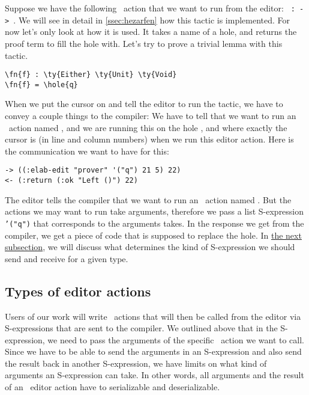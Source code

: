 Suppose we have the following \Elab\ action that we want to run from the editor:
\texttt{ :  ->  }.
We will see in detail in \autoref{ssec:hezarfen} how this tactic is
implemented. For now let's only look at how it is used. It takes a name of a
hole, and returns the proof term to fill the hole with.
Let's try to prove a trivial lemma with this tactic.

\begin{Verbatim}[framesep=2mm, label=\footnotesize{\normalfont{Idris}}, labelposition=topline]
\fn{f} : \ty{Either} \ty{Unit} \ty{Void}
\fn{f} = \hole{q}
\end{Verbatim}

When we put the cursor on  and tell the editor to run the 
tactic, we have to convey a couple things to the compiler: We have to tell that
we want to run an \Elab\ action named , and we are running this on
the hole , and where exactly the cursor is (in line and column numbers)
when we run this editor action. Here is the communication we want to have for this:

\begin{Verbatim}[framesep=2mm, label=\footnotesize{\normalfont{S-expression}}, labelposition=topline]
-> ((:elab-edit "prover" '("q") 21 5) 22)
<- (:return (:ok "Left ()") 22)
\end{Verbatim}

The editor tells the compiler that we want to run an \Elab\ action named
. But the actions we may want to run take arguments, therefore we
pass a list S-expression \texttt{'("q")} that corresponds to the arguments
 takes.
In the response we get from the compiler, we get a piece of code that is
supposed to replace the hole. In \hyperref[ssec:types]{the next subsection}, we
will discuss what determines the kind of S-expression we should send and
receive for a given type.

\subsection{Types of editor actions}\label{ssec:types}

Users of our work will write \Elab\ actions that will then be called from the
editor via S-expressions that are sent to the compiler. We outlined above that
in the S-expression, we need to pass the arguments of the specific
\Elab\ action we want to call. Since we have to be able to send the arguments
in an S-expression and also send the result back in another S-expression, we
have limits on what kind of arguments an S-expression can take.
In other words, all arguments and the result of an \Elab\ editor action
have to serializable and deserializable.

